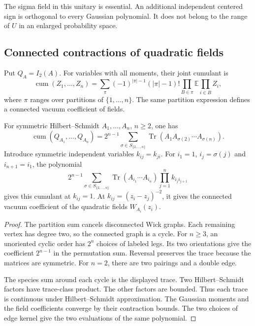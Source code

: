 The sigma field in this unitary is essential.
An additional independent centered sign is
orthogonal to every Gaussian polynomial.
It does not belong to the range of \(U\)
in an enlarged probability space.

\subsection{Connected contractions of quadratic fields}

Put \(Q_A=I_2(A)\). For variables with all moments,
their joint cumulant is
\[
 \operatorname{cum}(Z_1,\ldots,Z_n)
  =\sum_{\pi}(-1)^{|\pi|-1}(|\pi|-1)!
            \prod_{B\in\pi}\mathbb E\prod_{i\in B}Z_i,
\]
where \(\pi\) ranges over partitions of
\(\{1,\ldots,n\}\). The same partition expression
defines a connected vacuum coefficient of fields.

\begin{proposition}\label{v4-prop:singular-quadratic-cycles}
For symmetric Hilbert--Schmidt \(A_1,\ldots,A_n\),
\(n\geq2\), one has
\begin{equation}\label{v4-eq:singular-quadratic-cumulant}
 \operatorname{cum}(Q_{A_1},\ldots,Q_{A_n})
   =2^{n-1}\sum_{\sigma\in S_{\{2,\ldots,n\}}}
       \operatorname{Tr}(A_1A_{\sigma(2)}\cdots A_{\sigma(n)}).
\end{equation}
Introduce symmetric independent variables \(k_{ij}=k_{ji}\).
For \(i_1=1\), \(i_j=\sigma(j)\) and \(i_{n+1}=i_1\),
the polynomial
\begin{equation}\label{v4-eq:singular-common-cycle-polynomial}
 2^{n-1}\sum_{\sigma\in S_{\{2,\ldots,n\}}}
      \operatorname{Tr}(A_{i_1}\cdots A_{i_n})
                         \prod_{j=1}^n k_{i_j i_{j+1}}
\end{equation}
gives this cumulant at \(k_{ij}=1\).
At \(k_{ij}=(z_i-z_j)^{-2}\), it gives the
connected vacuum coefficient of the quadratic
fields \(W_{A_i}(z_i)\).
\end{proposition}

\begin{proof}
The partition sum cancels disconnected Wick graphs.
Each remaining vertex has degree two, so the
connected graph is a cycle. For \(n\geq3\), an
unoriented cyclic order has \(2^n\) choices of
labeled legs. Its two orientations give the
coefficient \(2^{n-1}\) in the permutation sum.
Reversal preserves the trace because the
matrices are symmetric. For \(n=2\), there
are two pairings and a double edge.

The species sum around each cycle is the
displayed trace. Two Hilbert--Schmidt factors
have trace-class product. The other factors
are bounded. Thus each trace is continuous
under Hilbert--Schmidt approximation.
The Gaussian moments and the field coefficients
converge by their contraction bounds.
The two choices of edge kernel give the
two evaluations of the same polynomial.
\end{proof}

